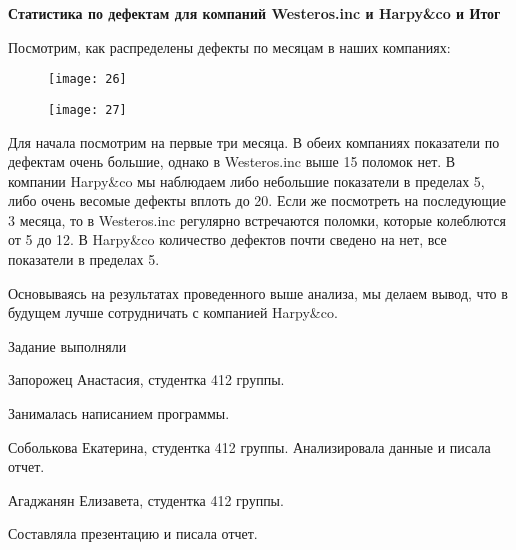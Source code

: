 \documentclass{beamer}
\begin{document}
\begin{frame}
\textbf{Статистика по дефектам для компаний Westeros.inc и Harpy\&co и Итог}

Посмотрим, как распределены дефекты по месяцам в наших компаниях:
\begin{figure}[t]
	\centering
	\texttt{[image: 26]}
	\label{fig:}
\end{figure}
\end{frame}

\begin{frame}
\begin{figure}[t]
	\centering
	\texttt{[image: 27]}
\end{figure}
\end{frame}

\begin{frame}

Для начала посмотрим на первые три месяца. В обеих компаниях показатели по дефектам очень большие, однако в Westeros.inc выше 15 поломок нет. В компании Harpy\&co мы наблюдаем либо небольшие показатели в пределах 5, либо очень весомые дефекты вплоть до 20. Если же посмотреть на последующие 3 месяца, то в Westeros.inc регулярно встречаются поломки, которые колеблются от 5 до 12. В Harpy\&co количество дефектов почти сведено на нет, все показатели в пределах 5.


Основываясь на результатах проведенного выше анализа, мы делаем вывод, что в будущем лучше сотрудничать с компанией Harpy\&co.

\end{frame}
\begin{frame}{Задание выполняли} 
\begin{itemize} 
	{ \item Запорожец Анастасия, студентка 412 группы. 
		
		Занималась написанием программы.
		\item Соболькова Екатерина, студентка 412 группы. Анализировала данные и писала отчет.
		\item Агаджанян Елизавета, студентка 412 группы. 
		
		Составляла презентацию и писала отчет. 
	} 
\end{itemize}
\end{frame}
\end{document}
